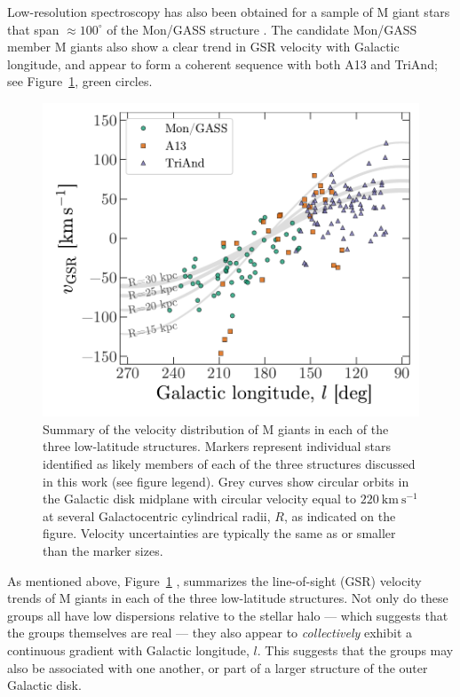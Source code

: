 \documentclass[galaxies,article,submit,moreauthors,pdftex,10pt,a4paper]{mdpi}
\newcommand{\kms}{\mathrm{km}~\mathrm{s}^{-1}}
\begin{document}
Low-resolution spectroscopy has also been obtained for a sample of M giant stars
that span $\approx 100^\circ$ of the Mon/GASS structure \cite{crane03}.
The candidate Mon/GASS member M giants also show a clear trend in GSR velocity
with Galactic longitude, and appear to form a coherent sequence with both A13
and TriAnd; see Figure~\ref{fig:ting_vel}, green circles.

\begin{figure}[!ht]
\centering
\includegraphics[width=5 in]{figures/vgsr.pdf}
\caption{\label{fig:ting_vel}
Summary of the velocity distribution of M giants in each of the three
low-latitude structures.
Markers represent individual stars identified as likely members of each of the
three structures discussed in this work (see figure legend).
Grey curves show circular orbits in the Galactic disk midplane with circular
velocity equal to $220~\kms$ at several Galactocentric cylindrical radii, $R$,
as indicated on the figure.
Velocity uncertainties are typically the same as or smaller than the marker
sizes.
}
\end{figure}

As mentioned above, Figure~\ref{fig:ting_vel} \cite[reproduced with data from
previous work,][]{li17}, summarizes the line-of-sight (GSR) velocity trends of M
giants in each of the three low-latitude structures.
Not only do these groups all have low dispersions relative to the stellar halo
--- which suggests that the groups themselves are real --- they also appear to
{\it collectively} exhibit a continuous gradient with Galactic longitude, $l$.
This suggests that the groups may also be associated with one another, or part
of a larger structure of the outer Galactic disk.
\end{document}
